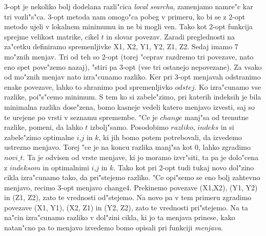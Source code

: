 \documentclass[12pt,a4paper]{amsart}
\theoremstyle{definition} %
\theoremstyle{plain} %
\begin{document}
3-opt je nekoliko bolj dodelana razli"cica \textit{local searcha}, zamenjamo namre"c kar tri vozli"s"ca. 3-opt metoda nam omogo"ca pobeg v primeru, ko bi se z 2-opt metodo ujeli v lokalnem minimumu in ne bi mogli ven. Tako kot 2-opt funkcija sprejme velikost matrike, 
cikel $t$ in slovar povezav. Zaradi preglednosti na za"cetku definiramo spremenljivke X1, X2, Y1, Y2, Z1, Z2. Sedaj imamo 7 mo"znih menjav. Tri od teh so 2-opt (torej "ceprav razdremo tri povezave, nato eno spet pove"zemo nazaj), "stiri pa 3-opt (vse tri ostanejo nepovezane). Za vsako od mo"znih menjav nato izra"cunamo razliko. Ker pri 3-opt menjavah odstranimo enake povezave, lahko to shranimo pod spremenljivko $odstej$. Ko izra"cunamo vse razlike, poi"s"cemo minimum.
S tem ko si zabele"zimo, pri katerih indeksih je bila minimalna razlika dose"zena, bomo kasneje vedeli katero menjavo izvesti, saj so te urejene po vrsti v seznamu spremembe. "Ce je $change$ manj"sa od trenutne razlike, pomeni, da lahko $t$ izbolj"samo. Posodobimo $razliko$, $indeks$ in si zabele"zimo optimalne $i$,$j$ in $k$, ki jih bomo potem potrebovali, da izvedemo ustrezno menjavo. Torej "ce je na koncu razlika manj"sa kot 0, lahko zgradimo $novi\_t$. Ta je odvisen od vrste menjave, ki jo moramo izvr"siti, ta pa je dolo"cena z $indeksom$ in optimalnimi $i$,$j$ in $k$. Tako kot pri 2-opt tudi tukaj novo dol"zino cikla izra"cunamo tako, da pri"stejemo razliko. 
"Ce opi"semo se eno bolj zahtevno menjavo, recimo 3-opt menjavo change4. Prekinemo povezave (X1,X2), (Y1, Y2) in (Z1, Z2), zato te vrednosti od"stejemo. Na novo pa v tem primeru zgradimo povezave
(X1, Y1), (X2, Z1) in (Y2, Z2), zato te vrednosti pri"stejemo. Na ta na"cin izra"cunamo razliko v dol"zini cikla, ki jo ta menjava prinese, kako natan"cno pa to menjavo izvedemo bomo opisali pri funkciji \textit{menjava}. 
\end{document}
